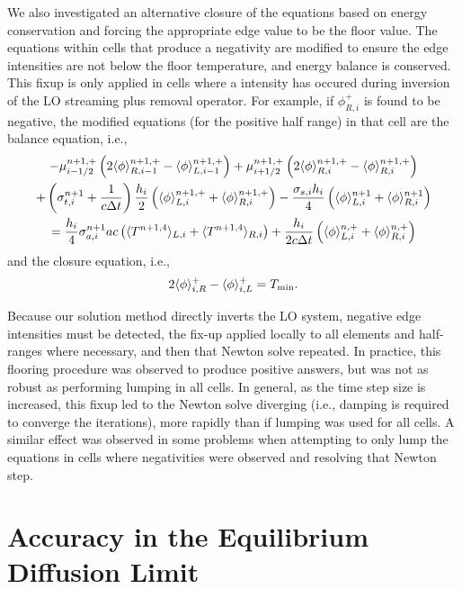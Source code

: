 We also investigated an alternative closure of the equations based on energy conservation
and forcing the appropriate edge value to be the floor value.
The equations within cells that produce a negativity are modified to ensure the edge
intensities are not below the floor temperature, and energy balance is
conserved.  This fixup is only applied in cells where a intensity has occured during
inversion of the LO streaming plus removal operator.  For example, if $\phi^+_{R,i}$
is found to be negative, the modified equations (for the positive half range) in that cell are
the balance equation, i.e., 
\begin{multline}\label{eq:floor_outflow}
    -{\mu}_{i-1/2}^{n+1,+} \left(2\langle \phi \rangle_{R,i-1}^{n+1,+} -   \langle \phi \rangle_{L,i-1}^{n+1,+}      \right) +
    {\mu}_{i+1/2}^{n+1,+} \left(2\langle \phi \rangle_{R,i}^{n+1,+} -
    \langle \phi \rangle_{R,i}^{n+1,+}\right) \\       
   +  \left(\sigma_{t,i}^{n+1}+\frac{1}{c \Delta t} \right)
  \frac{h_i}{2} \left(\langle \phi \rangle_{L,i}^{n+1,+} + \langle \phi \rangle_{R,i}^{n+1,+}\right) -  \frac{\sigma_{s,i} h_i}{4} \left( \langle \phi \rangle_{L,i}^{n+1} +
  \langle \phi \rangle_{R,i}^{n+1}\right)\\  = \frac{h_i}{4} \sigma_{a,i}^{n+1} a c \left(
    \langle T^{n+1,4} \rangle_{L,i} + \langle T^{n+1,4} \rangle_{R,i} \right) +
  \frac{h_i}{2c\Delta t}\left(\langle \phi \rangle_{L,i}^{n,+} + \langle \phi \rangle_{R,i}^{n,+}\right)
\end{multline}
and the closure equation, i.e., 
\begin{equation}\label{eq:clos_outflow}
    2\langle \phi \rangle_{i,R}^+ - \langle \phi \rangle_{i,L}^+ = T_{\min}.
\end{equation}

Because our solution method directly inverts the LO system,
negative edge intensities must be detected, the fix-up applied locally to all elements and half-ranges
where necessary, and then that Newton solve
repeated.  In practice, this flooring procedure was observed to produce positive answers, but was not as robust as performing
lumping in all cells.  In general, as the time step size is increased, this fixup led to the Newton
solve diverging (i.e., damping is required to converge the iterations), more rapidly than if lumping was
used for all cells.  A similar effect was observed in some problems when attempting to only lump the
equations in cells where negativities were observed and resolving that Newton step.


\section{Accuracy in the Equilibrium Diffusion Limit}
\label{sec:edl_overview}

